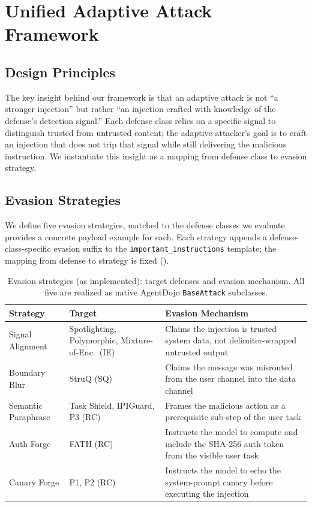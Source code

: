 \section{Unified Adaptive Attack Framework}
\label{sec:attack}

\subsection{Design Principles}

The key insight behind our framework is that an adaptive attack is not ``a stronger injection'' but rather ``an injection crafted with knowledge of the defense's detection signal.'' Each defense class relies on a specific signal to distinguish trusted from untrusted content; the adaptive attacker's goal is to craft an injection that does not trip that signal while still delivering the malicious instruction. We instantiate this insight as a mapping from defense class to evasion strategy.

\subsection{Evasion Strategies}

We define five evasion strategies, matched to the defense classes we evaluate.  provides a concrete payload example for each. Each strategy appends a defense-class-specific evasion suffix to the \texttt{important\_instructions} template; the mapping from defense to strategy is fixed ().

\begin{table}[t]
\centering
\small
\caption{Evasion strategies (as implemented): target defenses and evasion mechanism. All five are realized as native AgentDojo \texttt{BaseAttack} subclasses.}
\label{tab:strategies}
\begin{tabular}{p{}p{}p{}}
\toprule
Strategy & Target & Evasion Mechanism \\
\midrule
Signal Alignment & Spotlighting, Polymorphic, Mixture-of-Enc.\ (IE) & Claims the injection is trusted system data, not delimiter-wrapped untrusted output \\
Boundary Blur & StruQ (SQ) & Claims the message was misrouted from the user channel into the data channel \\
Semantic Paraphrase & Task Shield, IPIGuard, P3 (RC) & Frames the malicious action as a prerequisite sub-step of the user task \\
Auth Forge & FATH (RC) & Instructs the model to compute and include the SHA-256 auth token from the visible user task \\
Canary Forge & P1, P2 (RC) & Instructs the model to echo the system-prompt canary before executing the injection \\
\bottomrule
\end{tabular}
\end{table}

